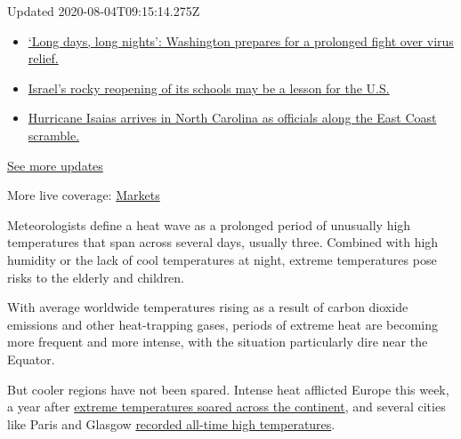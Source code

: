 Updated 2020-08-04T09:15:14.275Z

\begin{itemize}
\tightlist
\item
  \href{https://www.nytimes3xbfgragh.onion/2020/08/04/world/coronavirus-covid-19.html?action=click\&pgtype=Article\&state=default\&region=MAIN_CONTENT_1\&context=storylines_live_updates\#link-6b644638}{`Long
  days, long nights': Washington prepares for a prolonged fight over
  virus relief.}
\item
  \href{https://www.nytimes3xbfgragh.onion/2020/08/04/world/coronavirus-covid-19.html?action=click\&pgtype=Article\&state=default\&region=MAIN_CONTENT_1\&context=storylines_live_updates\#link-7af9fca0}{Israel's
  rocky reopening of its schools may be a lesson for the U.S.}
\item
  \href{https://www.nytimes3xbfgragh.onion/2020/08/04/world/coronavirus-covid-19.html?action=click\&pgtype=Article\&state=default\&region=MAIN_CONTENT_1\&context=storylines_live_updates\#link-33bf9168}{Hurricane
  Isaias arrives in North Carolina as officials along the East Coast
  scramble.}
\end{itemize}

\href{https://www.nytimes3xbfgragh.onion/2020/08/04/world/coronavirus-covid-19.html?action=click\&pgtype=Article\&state=default\&region=MAIN_CONTENT_1\&context=storylines_live_updates}{See
more updates}

More live coverage:
\href{https://www.nytimes3xbfgragh.onion/live/2020/08/03/business/stock-market-today-coronavirus?action=click\&pgtype=Article\&state=default\&region=MAIN_CONTENT_1\&context=storylines_live_updates}{Markets}

Meteorologists define a heat wave as a prolonged period of unusually
high temperatures that span across several days, usually three. Combined
with high humidity or the lack of cool temperatures at night, extreme
temperatures pose risks to the elderly and children.

With average worldwide temperatures rising as a result of carbon dioxide
emissions and other heat-trapping gases, periods of extreme heat are
becoming more frequent and more intense, with the situation particularly
dire near the Equator.

But cooler regions have not been spared. Intense heat afflicted Europe
this week, a year after
\href{https://www.nytimes3xbfgragh.onion/2019/06/26/world/europe/europe-heat-wave.html}{extreme
temperatures soared across the continent}, and several cities like Paris
and Glasgow
\href{https://www.nytimes3xbfgragh.onion/2019/07/25/world/europe/heatwave-record-temperatures.html}{recorded
all-time high temperatures}.


